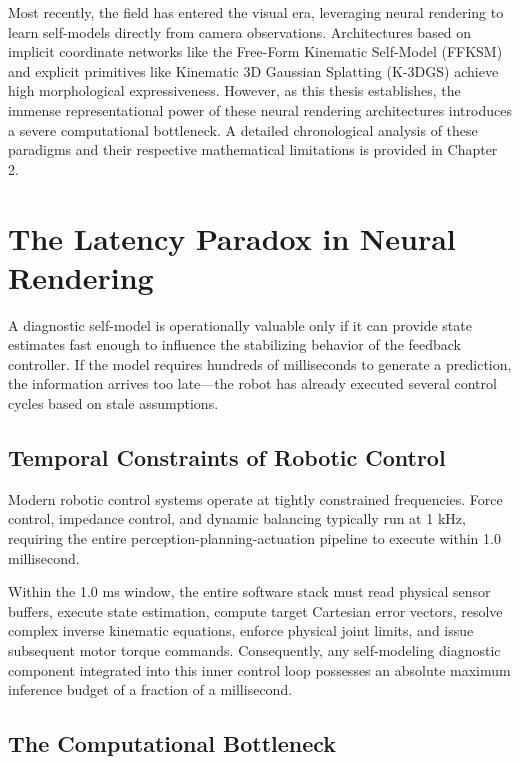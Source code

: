 \documentclass[12pt,a4paper,oneside]{report}
\begin{document}
Most recently, the field has entered the visual era, leveraging neural rendering to learn self-models directly from camera observations. Architectures based on implicit coordinate networks like the Free-Form Kinematic Self-Model (FFKSM) and explicit primitives like Kinematic 3D Gaussian Splatting (K-3DGS) achieve high morphological expressiveness. However, as this thesis establishes, the immense representational power of these neural rendering architectures introduces a severe computational bottleneck. A detailed chronological analysis of these paradigms and their respective mathematical limitations is provided in Chapter 2.

\section{The Latency Paradox in Neural Rendering}
\label{sec:latency_paradox}

A diagnostic self-model is operationally valuable only if it can provide state estimates fast enough to influence the stabilizing behavior of the feedback controller. If the model requires hundreds of milliseconds to generate a prediction, the information arrives too late---the robot has already executed several control cycles based on stale assumptions.

\subsection{Temporal Constraints of Robotic Control}
\label{subsec:temporal_constraints}

Modern robotic control systems operate at tightly constrained frequencies. Force control, impedance control, and dynamic balancing typically run at 1 kHz, requiring the entire perception-planning-actuation pipeline to execute within 1.0 millisecond. 

Within the 1.0 ms window, the entire software stack must read physical sensor buffers, execute state estimation, compute target Cartesian error vectors, resolve complex inverse kinematic equations, enforce physical joint limits, and issue subsequent motor torque commands. Consequently, any self-modeling diagnostic component integrated into this inner control loop possesses an absolute maximum inference budget of a fraction of a millisecond.

\subsection{The Computational Bottleneck}
\label{subsec:computational_bottleneck}
\end{document}
